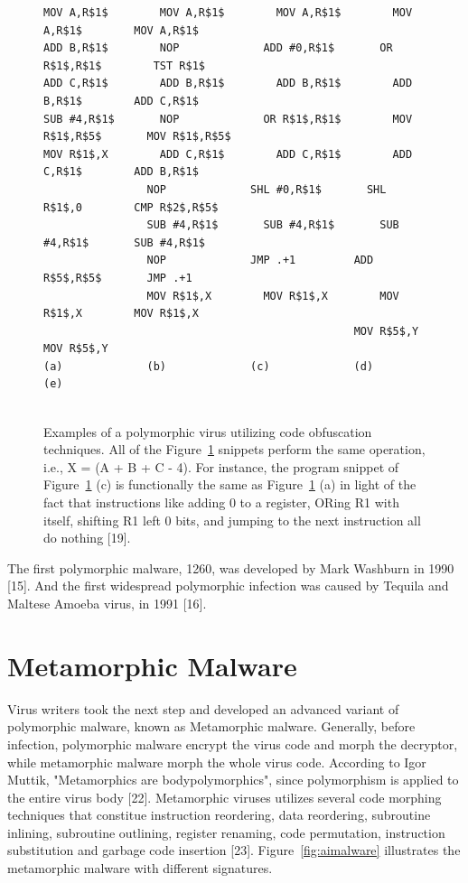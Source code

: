 \begin{figure}
  \centering
\begin{lstlisting}[language=myasm]
MOV A,R$1$        MOV A,R$1$        MOV A,R$1$        MOV A,R$1$        MOV A,R$1$
ADD B,R$1$        NOP             ADD #0,R$1$       OR R$1$,R$1$        TST R$1$
ADD C,R$1$        ADD B,R$1$        ADD B,R$1$        ADD B,R$1$        ADD C,R$1$
SUB #4,R$1$       NOP             OR R$1$,R$1$        MOV R$1$,R$5$       MOV R$1$,R$5$
MOV R$1$,X        ADD C,R$1$        ADD C,R$1$        ADD C,R$1$        ADD B,R$1$
                NOP             SHL #0,R$1$       SHL R$1$,0        CMP R$2$,R$5$
                SUB #4,R$1$       SUB #4,R$1$       SUB #4,R$1$       SUB #4,R$1$
                NOP             JMP .+1         ADD R$5$,R$5$       JMP .+1
                MOV R$1$,X        MOV R$1$,X        MOV R$1$,X        MOV R$1$,X
                                                MOV R$5$,Y        MOV R$5$,Y
(a)             (b)             (c)             (d)             (e)


\end{lstlisting}
    \caption[Examples of a polymorphic virus.]{Examples of a polymorphic virus utilizing code obfuscation techniques. All of the Figure~\ref{fig:polyvirus} snippets perform the same operation, i.e.,  X = (A + B + C - 4). For instance, the program snippet of Figure~\ref{fig:polyvirus} (c) is functionally the same as Figure~\ref{fig:polyvirus} (a) in light of the fact that instructions like adding 0 to a register, ORing R1 with itself, shifting R1 left 0 bits, and jumping to the next instruction all do nothing [19].}
    \label{fig:polyvirus}
\end{figure}

    
The first polymorphic malware, 1260, was developed by Mark Washburn in 1990 [15]. And the first widespread polymorphic infection was caused by Tequila and Maltese Amoeba virus, in 1991 [16].

\section{Metamorphic Malware} 

Virus writers took the next step and developed an advanced variant of polymorphic malware, known as Metamorphic malware. Generally, before infection, polymorphic malware encrypt the virus code and morph the decryptor, while metamorphic malware morph the whole virus code. According to Igor Muttik, "Metamorphics are bodypolymorphics", since polymorphism is applied to the entire virus body [22]. Metamorphic viruses utilizes several code morphing techniques that constitue instruction reordering, data reordering, subroutine inlining, subroutine outlining, register renaming, code permutation, instruction substitution and garbage code insertion [23]. Figure~\ref{fig:aimalware} illustrates the metamorphic malware with different signatures.

